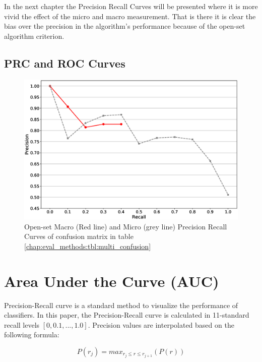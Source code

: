 {In the next chapter the Precision Recall Curves will be presented where it is more vivid the effect of the micro and macro measurement. That is there it is clear the bias over the precision in the algorithm's performance because of the open-set algorithm criterion.


\subsection{PRC and ROC Curves}\label{chap:eval_methods:sec:roc_prc}



\begin{figure}[t]
	\begin{center}
    	\includegraphics[scale=0.4]{Figures/pr_macro_micro_example.eps}
		\caption{Open-set Macro (Red line) and Micro (grey line) Precision Recall Curves of confusion matrix in table \ref{chap:eval_methods:tbl:multi_confusion}}
		\label{chap:eval_methods:tbl:prc_macro}
	\end{center}
\end{figure}


\section{Area Under the Curve (AUC)}\label{chap:eval_methods:sec:closed_set_classification} 

Precision-Recall curve is a standard method to visualize the performance of classifiers. In this paper, the Precision-Recall curve is calculated in 11-standard recall levels $[0,0.1,...,1.0]$. Precision values are interpolated based on the following formula:

\begin{equation}
	P(r_j)=max_{r_j \leqslant r \leqslant r_{j+1}}(P(r))
\end{equation}

}
